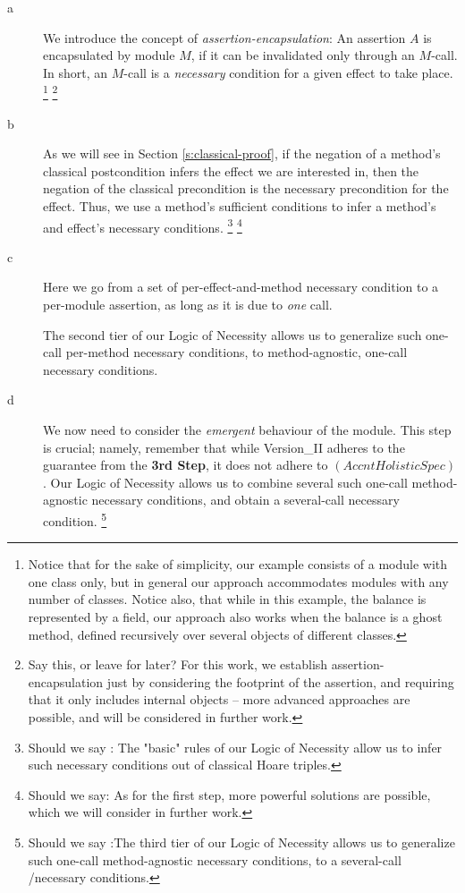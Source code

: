 \begin{description}
\item[a] We introduce the concept of \emph{assertion-encapsulation}: An assertion $A$  is
encapsulated by  module $M$, if it can be invalidated only through
    an $M$-\internalC call. 
  In short, an $M$-\internalC call is a \emph{necessary} condition for
a given effect to take place.
\footnote{Notice that for the sake of simplicity, our example consists of a module with one class only, but 
    in general our approach accommodates modules with any number of classes.
     Notice also, that while in this example, the balance is 
represented by a field, our approach also works when the balance is a ghost method, defined 
recursively over several objects of different classes.}
\footnote{Say this, or  leave for later? For this work, we establish assertion-encapsulation just by considering the 
footprint of the assertion, and requiring that it only includes internal objects --
more advanced approaches are possible, and will be considered in further work.}


\item[b]  
 As we will see in Section \ref{s:classical-proof}, 
if the negation of a method's
 classical postcondition infers  the effect we are interested in, then the negation of the 
 classical precondition  is the necessary precondition for the effect. Thus, 
we use a method's sufficient conditions to infer a method's and effect's necessary conditions.
\footnote{Should we say :
  The "basic" rules of our Logic of Necessity allow us to infer such necessary conditions out of classical Hoare triples. }
\footnote{Should we say: As for the first step, more powerful solutions are possible, which we will consider  in further work. }

\item[c]  Here we go from a set
of per-effect-and-method necessary  condition to a per-module assertion, as long as it is due to 
\emph{one} \internalC call.

The second tier of our Logic of Necessity allows us to generalize  such one-call per-method necessary conditions, to   method-agnostic, one-call necessary conditions.

\item[d] 
We now need to consider the \emph{emergent} behaviour of the module.  This step is crucial; namely, remember that while Version\_II adheres to
the guarantee from the \textbf{3rd Step}, it does not adhere to  $(AccntHolisticSpec)$.   
Our Logic of Necessity allows us to combine  several such one-call method-agnostic necessary conditions, and obtain a several-call   necessary condition.
\footnote{Should we say :The third tier of our Logic of Necessity allows us to generalize  such one-call method-agnostic necessary conditions, to a several-call \internalC/\externalC necessary conditions.}

\end{description} 
